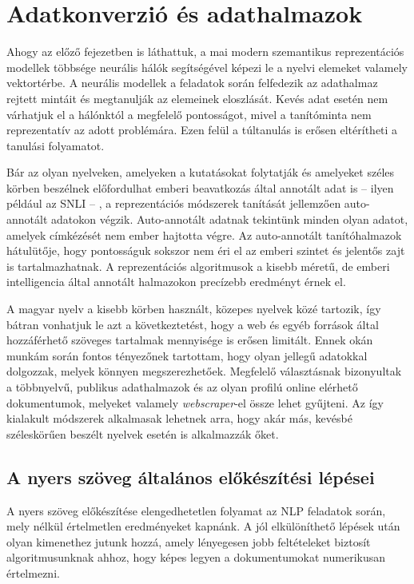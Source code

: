 \chapter{Adatkonverzió és adathalmazok}
\label{ch:datasets}

Ahogy az előző fejezetben is láthattuk, a mai modern szemantikus reprezentációs modellek többsége neurális hálók segítségével képezi le a nyelvi elemeket valamely vektortérbe. A neurális modellek a feladatok során felfedezik az adathalmaz rejtett mintáit és megtanulják az elemeinek eloszlását. Kevés adat esetén nem várhatjuk el a hálónktól a megfelelő pontosságot, mivel a tanítóminta nem reprezentatív az adott problémára. Ezen felül a túltanulás is erősen eltérítheti a tanulási folyamatot.

Bár az olyan nyelveken, amelyeken a kutatásokat folytatják és amelyeket széles körben beszélnek előfordulhat emberi beavatkozás által annotált adat is – ilyen például az SNLI – , a reprezentációs módszerek tanítását jellemzően auto-annotált adatokon végzik. Auto-annotált adatnak tekintünk minden olyan adatot, amelyek címkézését nem ember hajtotta végre. Az auto-annotált tanítóhalmazok hátulütője, hogy pontosságuk sokszor nem éri el az emberi szintet és jelentős zajt is tartalmazhatnak. A reprezentációs algoritmusok a kisebb méretű, de emberi intelligencia által annotált halmazokon precízebb eredményt érnek el. \cite{infer}

A magyar nyelv a kisebb körben használt, közepes nyelvek közé tartozik, így bátran vonhatjuk le azt a következtetést, hogy a web és egyéb források által hozzáférhető szöveges tartalmak mennyisége is erősen limitált.
Ennek okán munkám során fontos tényezőnek tartottam, hogy olyan jellegű adatokkal dolgozzak, melyek könnyen megszerezhetőek. Megfelelő választásnak bizonyultak a többnyelvű, publikus adathalmazok és az olyan profilú online elérhető dokumentumok, melyeket valamely \textit{webscraper}-el össze lehet gyűjteni. Az így kialakult módszerek alkalmasak lehetnek arra, hogy akár más, kevésbé széleskörűen beszélt nyelvek esetén is alkalmazzák őket.

\section{A nyers szöveg általános előkészítési lépései}

A nyers szöveg előkészítése elengedhetetlen folyamat az NLP feladatok során, mely nélkül értelmetlen eredményeket kapnánk. A jól elkülöníthető lépések után olyan kimenethez jutunk hozzá, amely lényegesen jobb feltételeket biztosít algoritmusunknak ahhoz, hogy képes legyen a dokumentumokat numerikusan értelmezni.

